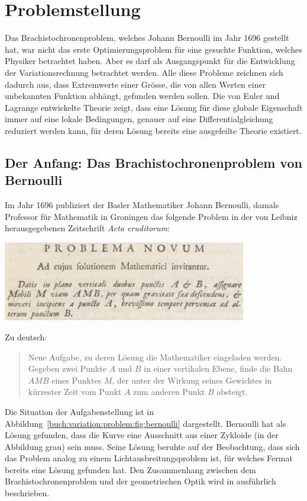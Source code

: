 %
%
%
\section{Problemstellung
\label{buch:variation:section:problemstellung}}
Das Brachistochronenproblem, welches Johann Bernoulli im Jahr 1696
gestellt hat, war nicht das erste Optimierungsproblem für eine 
gesuchte Funktion, welches Physiker betrachtet haben.
Aber es darf als Ausgangspunkt für die Entwicklung der Variationsrechnung
betrachtet werden.
Alle diese Probleme zeichnen sich dadurch aus, dass Extremwerte
einer Grösse, die von allen Werten einer unbekannten Funktion abhängt,
gefunden werden sollen.
Die von Euler und Lagrange entwickelte Theorie zeigt, dass eine
Lösung für diese globale Eigenschaft immer auf eine lokale Bedingungen,
genauer auf eine Differentialgleichung reduziert werden kann, für deren
Lösung bereits eine ausgefeilte Theorie existiert.

%
%
\subsection{Der Anfang: Das Brachistochronenproblem von Bernoulli
\label{buch:variation:problem:subsection:brachistochrone}}
%

Im Jahr 1696 publiziert der Basler Mathematiker Johann Bernoulli, damals
Professor für Mathematik in Groningen das folgende Problem in der
von Leibniz herausgegebenen Zeitschrift {\em Acta eruditorum}:
\begin{center}
\includegraphics[width=0.8\textwidth]{chapters/020-variation/images/latein.jpg}
\end{center}
Zu deutsch:
\begin{quote}
Neue Aufgabe, zu deren Lösung die Mathematiker eingeladen werden.
Gegeben zwei Punkte $A$ und $B$ in einer vertikalen Ebene, finde
die Bahn $AMB$ eines Punktes $M$, der unter der Wirkung seines
Gewichtes in kürzester Zeit vom Punkt $A$ zum anderen Punkt $B$ absteigt.
\end{quote}
Die Situation der Aufgabenstellung ist in
Abbildung~\ref{buch:variation:problem:fig:bernoulli}
dargestellt.
Bernoulli hat als Lösung gefunden, dass die Kurve eine Ausschnitt
aus einer Zykloide (in der Abbildung grau) sein muss.
Seine Lösung beruhte auf der Beobachtung, dass sich das Problem analog
zu einem Lichtausbreitungsproblem ist, für welches Fermat bereits
eine Lösung gefunden hat.
Den Zusammenhang zwischen dem Brachistochronenproblem und der geometrischen
Optik wird in \cite{buch:broer} ausführlich beschrieben.

